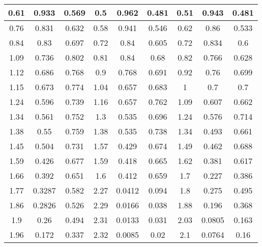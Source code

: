 \begin{table*}[]
\begin{tabular}{|c|c|c|c|c|c|c|c|c|}
0.61        & 0.933        & 0.569      & 0.5        & 0.962      & 0.481        & 0.51       & 0.943       & 0.481        \\ \hline
0.76        & 0.831        & 0.632      & 0.58       & 0.941      & 0.546        & 0.62       & 0.86        & 0.533        \\ \hline
0.84        & 0.83         & 0.697      & 0.72       & 0.84       & 0.605        & 0.72       & 0.834       & 0.6          \\ \hline
1.09        & 0.736        & 0.802      & 0.81       & 0.84       & 0.68         & 0.82       & 0.766       & 0.628        \\ \hline
1.12        & 0.686        & 0.768      & 0.9        & 0.768      & 0.691        & 0.92       & 0.76        & 0.699        \\ \hline
1.15        & 0.673        & 0.774      & 1.04       & 0.657      & 0.683        & 1          & 0.7         & 0.7          \\ \hline
1.24        & 0.596        & 0.739      & 1.16       & 0.657      & 0.762        & 1.09       & 0.607       & 0.662        \\ \hline
1.34        & 0.561        & 0.752      & 1.3        & 0.535      & 0.696        & 1.24       & 0.576       & 0.714        \\ \hline
1.38        & 0.55         & 0.759      & 1.38       & 0.535      & 0.738        & 1.34       & 0.493       & 0.661        \\ \hline
1.45        & 0.504        & 0.731      & 1.57       & 0.429      & 0.674        & 1.49       & 0.462       & 0.688        \\ \hline
1.59        & 0.426        & 0.677      & 1.59       & 0.418      & 0.665        & 1.62       & 0.381       & 0.617        \\ \hline
1.66        & 0.392        & 0.651      & 1.6        & 0.412      & 0.659        & 1.7        & 0.227       & 0.386        \\ \hline
1.77        & 0.3287       & 0.582      & 2.27       & 0.0412     & 0.094        & 1.8        & 0.275       & 0.495        \\ \hline
1.86        & 0.2826       & 0.526      & 2.29       & 0.0166     & 0.038        & 1.88       & 0.196       & 0.368        \\ \hline
1.9         & 0.26         & 0.494      & 2.31       & 0.0133     & 0.031        & 2.03       & 0.0805      & 0.163        \\ \hline
1.96        & 0.172        & 0.337      & 2.32       & 0.0085     & 0.02         & 2.1        & 0.0764      & 0.16         \\ \hline

\end{tabular}
\end{table*}
